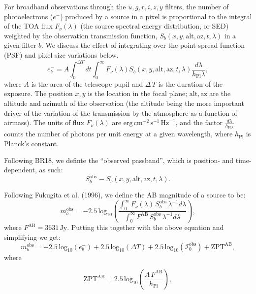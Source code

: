 \documentclass[SE,authoryear,lsstdraft,toc]{lsstdoc}
\newcommand{\etron}{e^{-}}
\newcommand{\mobs}{m_b^{\mathrm{obs}}}
\newcommand{\Sobs}{S_b^{\mathrm{obs}}}
\newcommand{\Iobs}{\mathcal{I}_0^{\mathrm{obs}}}
\begin{document}
For broadband observations through the ${u,g,r,i,z,y}$ filters, the number of
photoelectrons ($\etron$) produced by a source in a pixel is proportional to the
integral of the TOA flux $F_\nu(\lambda)$ (the source spectral energy
distribution, or SED) weighted by the observation
transmission function, $S_b(x, y, \mathrm{alt}, \mathrm{az}, t, \lambda)$ in a
given filter $b$.  We discuss the effect of integrating over the point spread
function (PSF) and pixel size variations below.
%
\begin{equation}
\etron_b = A \int_0^{\Delta T}dt \int_0^\infty
F_\nu(\lambda) S_b(x, y, \mathrm{alt}, \mathrm{az}, t, \lambda)
\frac{d\lambda}{h_{\mathrm{Pl}}\lambda},
\end{equation}
%
where $A$ is the area of the telescope pupil and $\Delta\,T$ is the duration of
the exposure.  The position ${x, y}$ is the location in the focal plane;
${\mathrm{alt}, \mathrm{az}}$ are the altitude and azimuth of the observation
(the altitude being the more important driver of the variation of the
transmission by the atmosphere as a function of airmass).  The units of flux
$F_\nu(\lambda)$ are
$\mathrm{erg}\,\mathrm{cm}^{-2}\,\mathrm{s}^{-1}\,\mathrm{Hz}^{-1}$, and the
factor $\frac{d\lambda}{h_{\mathrm{Pl}\lambda}}$ counts the number of photons
per unit energy at a given wavelength, where $h_{\mathrm{Pl}}$ is Planck's
constant.

Following BR18, we definte the ``observed passband'', which is position- and
time-dependent, as such:
%
\begin{equation}
\Sobs \equiv S_b(x, y, \mathrm{alt}, \mathrm{az}, t, \lambda).
\end{equation}

Following Fukugita et al. (1996), we define the AB magnitude of a source to be:
%
\begin{equation}
\mobs = -2.5\,\mathrm{log}_{10} \left ( \frac{\int_0^{\infty}
  F_\nu(\lambda)\,\Sobs\,\lambda^{-1}d\lambda}{\int_0^{\infty}
  F^{\mathrm{AB}}\,\Sobs\,\lambda^{-1}d\lambda} \right ),
\end{equation}
%
where $F^{\mathrm{AB}} = 3631\,\mathrm{Jy}$.  Putting this together with the
above equation and simplifying we get:
%
\begin{equation}
\mobs = -2.5\,\mathrm{log}_{10}(\etron_b) +
2.5\,\mathrm{log}_{10}({\Delta}T) + 2.5\,\mathrm{log}_{10}(\Iobs) +
\mathrm{ZPT}^{\mathrm{AB}},
\end{equation}
%
where

\begin{equation}
\mathrm{ZPT}^{\mathrm{AB}} = 2.5\,\mathrm{log}_{10}
 \left (\frac{A\,F^{\mathrm{AB}}}{h_{\mathrm{Pl}}} \right ),
\end{equation}
\end{document}
